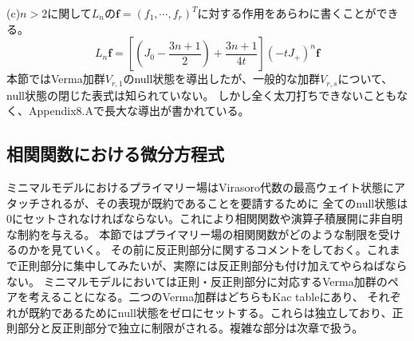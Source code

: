 \documentclass[11pt, aps, longbibliography]{article}
\numberwithin{equation}{section}
\begin{document}
    (c)$n>2$に関して$L_n$の$\mathbf{f}=(f_1,\cdots,f_r)^T$に対する作用をあらわに書くことができる。
    \begin{equation}\label{eq:nullvec16}
        L_n \mathbf{f} = \left[ \left( J_0 - \frac{3n+1}{2} \right) + \frac{3n+1}{4t} \right] (-tJ_+)^n \mathbf{f}
    \end{equation}
    本節ではVerma加群$V_{r,1}$のnull状態を導出したが、一般的な加群$V_{r,s}$について、null状態の閉じた表式は知られていない。
    しかし全く太刀打ちできないこともなく、Appendix8.Aで長大な導出が書かれている。

    \subsection{相関関数における微分方程式}
    ミニマルモデルにおけるプライマリー場はVirasoro代数の最高ウェイト状態にアタッチされるが、その表現が既約であることを要請するために
    全てのnull状態は0にセットされなければならない。これにより相関関数や演算子積展開に非自明な制約を与える。
    本節ではプライマリー場の相関関数がどのような制限を受けるのかを見ていく。
    その前に反正則部分に関するコメントをしておく。これまで正則部分に集中してみたいが、実際には反正則部分も付け加えてやらねばならない。
    ミニマルモデルにおいては正則・反正則部分に対応するVerma加群のペアを考えることになる。二つのVerma加群はどちらもKac tableにあり、
    それぞれが既約であるためにnull状態をゼロにセットする。これらは独立しており、正則部分と反正則部分で独立に制限がされる。複雑な部分は次章で扱う。
\end{document}
